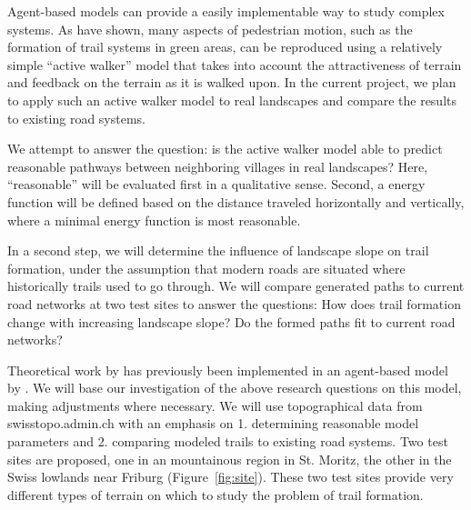 \documentclass[a4paper, DIV11, abstracton]{scrartcl}
\begin{document}

Agent-based models can provide a easily implementable way to study complex systems. As \citet{helbing:1997} have shown, many aspects of pedestrian motion, such as the formation of trail systems in green areas, can be reproduced using a relatively simple ``active walker'' model that takes into account the attractiveness of terrain and feedback on the terrain as it is walked upon. In the current project, we plan to apply such an active walker model to real landscapes and compare the results to existing road systems.




We attempt to answer the question: is the active walker model able to predict reasonable pathways between neighboring villages in real landscapes? Here, ``reasonable'' will be evaluated first in a qualitative sense. Second, a energy function will be defined based on the distance traveled horizontally and vertically, where a minimal energy function is most reasonable.

In a second step, we will determine the influence of landscape slope on trail formation, under the assumption that modern roads are situated where historically trails used to go through. We will compare generated paths to current road networks at two test sites to answer the questions: How does trail formation change with increasing landscape slope? Do the formed paths fit to current road networks?

Theoretical work by \citet{helbing:1997} has previously been implemented in an agent-based model by \citet{trailsystems}. We will base our investigation of the above research questions on this model, making adjustments where necessary. We will use topographical data from swisstopo.admin.ch with an emphasis on 1. determining reasonable model parameters and 2. comparing modeled trails to existing road systems. Two test sites are proposed, one in an mountainous region in St. Moritz, the other in the Swiss lowlands near Friburg (Figure~\ref{fig:site}). These two test sites provide very different types of terrain on which to study the problem of trail formation.
\end{document}
